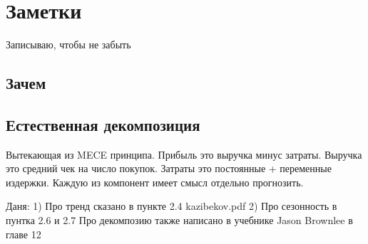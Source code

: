 \chapter{Заметки}
Записываю, чтобы не забыть

\section{Зачем}

\section{Естественная декомпозиция}

Вытекающая из MECE принципа. Прибыль это выручка минус затраты.
Выручка это средний чек на число покупок. Затраты это постоянные +
переменные издержки.
Каждую из компонент имеет смысл отдельно прогнозить.

Даня:
1) Про тренд сказано в пункте 2.4 kazibekov.pdf 
2) Про сезонность в пунтка 2.6 и 2.7
Про декомпозию также написано в учебнике Jason Brownlee в главе 12
